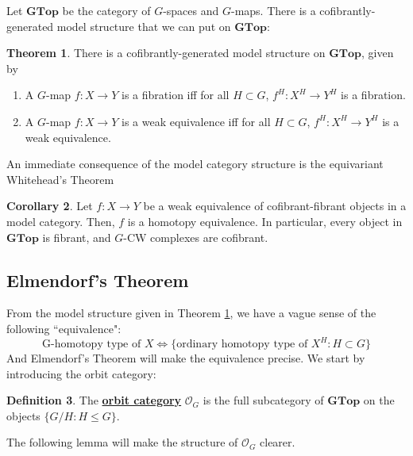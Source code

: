 \documentclass{article}
\theoremstyle{definition}
\newtheorem{theorem}{Theorem}[section] %
\newtheorem{definition}[theorem]{Definition}
\newtheorem{corollary}[theorem]{Corollary}
\begin{document}
Let $\textbf{GTop}$ be the category of $G$-spaces and $G$-maps. There is a cofibrantly-generated model structure that we can put on $\textbf{GTop}$:

\begin{tcolorbox}[colback=red!5!white,colframe=red!30!white]
\begin{theorem}
\label{Fine-model}
    There is a cofibrantly-generated model structure on $\textbf{GTop}$, given by 
    \begin{enumerate}
        \item A $G$-map $f:X\to Y$ is a fibration iff for all $H\subset G$, $f^H: X^H\to Y^H$ is a fibration.
        \item A $G$-map $f:X\to Y$ is a weak equivalence iff for all $H\subset G$, $f^H: X^H\to Y^H$ is a weak equivalence. 
    \end{enumerate}
\end{theorem}
\end{tcolorbox}
An immediate consequence of the model category structure is the equivariant Whitehead's Theorem

\begin{tcolorbox}[colback=green!5!white,colframe=green!30!white]
\begin{corollary}
Let $f: X\to Y$ be a weak equivalence of cofibrant-fibrant objects in a model category. Then, $f$ is a homotopy equivalence. In particular, every object in $\textbf{GTop}$ is fibrant, and $G$-CW complexes are  cofibrant. 
\end{corollary}
\end{tcolorbox}

\subsection{Elmendorf's Theorem}
From the model structure given in Theorem \ref{Fine-model}, we have a vague sense of the following ``equivalence":
\[\textrm{G-homotopy type of } X\Leftrightarrow \{ \textrm{ordinary homotopy type of } X^H:H\subset G \}\]
And Elmendorf's Theorem will make the equivalence precise. We start by introducing the orbit category:

\begin{tcolorbox}[colback=purple!5!white,colframe=purple!75!black]
\begin{definition}
The \underline{\textbf{orbit category}} $\mathcal{O}_G$ is the full subcategory of $\textbf{GTop}$ on the objects $\{G/H: H\leq G\}$.
\end{definition}
\end{tcolorbox}
The following lemma will make the structure of $\mathcal{O}_G$ clearer.
\end{document}
